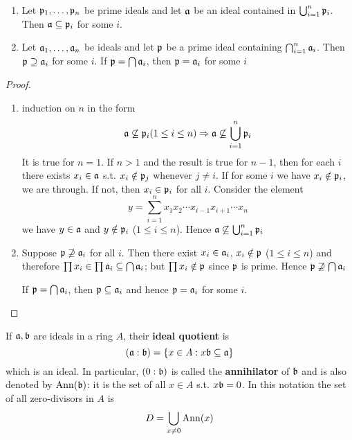 \documentclass[11pt]{article}
\begin{document}
\begin{proposition}[]
\label{1.11}
\begin{enumerate}
\item Let \(\mathfrak{p}_1,\dots,\mathfrak{p}_n\) be prime ideals and let \(\mathfrak{a}\) be an ideal contained in \(\bigcup_{i=1}^n\mathfrak{p}_i\).
Then \(\mathfrak{a}\subseteq\mathfrak{p}_i\) for some \(i\).
\item Let \(\mathfrak{a}_1,\dots,\mathfrak{a}_n\) be ideals and let \(\mathfrak{p}\) be a prime ideal containing \(\bigcap_{i=1}^n\mathfrak{a}_i\).
Then \(\mathfrak{p}\supseteq\mathfrak{a}_i\) for some \(i\). If \(\mathfrak{p}=\bigcap\mathfrak{a}_i\), then \(\mathfrak{p}=\mathfrak{a}_i\) for some \(i\)
\end{enumerate}
\end{proposition}

\begin{proof}
\begin{enumerate}
\item induction on \(n\) in the form
\begin{equation*}
\mathfrak{a}\not\subseteq\mathfrak{p}_i(1\le i\le n)\Rightarrow\mathfrak{a}\not\subseteq\bigcup_{i=1}^n\mathfrak{p}_i
\end{equation*}
It is true for \(n=1\). If \(n>1\) and the result is true for \(n-1\), then for each \(i\)
there exists \(x_i\in\mathfrak{a}\) s.t. \(x_i\notin\mathfrak{p}_j\) whenever \(j\neq i\). If for some \(i\) we have \(x_i\notin\mathfrak{p}_i\),
we are through. If not, then \(x_i\in\mathfrak{p}_i\) for all \(i\). Consider the element
\begin{equation*}
y=\sum_{i=1}^nx_1x_2\cdots x_{i-1}x_{i+1}\cdots x_n
\end{equation*}
we have \(y\in\mathfrak{a}\) and \(y\notin\mathfrak{p}_i\) (\(1\le i\le n\)). Hence \(\mathfrak{a}\not\subseteq\bigcup_{i=1}^n\mathfrak{p}_i\)
\item Suppose \(\mathfrak{p}\not\supseteq\mathfrak{a}_i\) for all \(i\). Then there exist \(x_i\in\mathfrak{a}_i\), \(x_i\notin\mathfrak{p}\) (\(1\le i\le n\)) and
therefore \(\prod x_i\in\prod\mathfrak{a}_i\subseteq\bigcap\mathfrak{a}_i\); but \(\prod x_i\notin\mathfrak{p}\) since \(\mathfrak{p}\) is prime. Hence \(\mathfrak{p}\not\supseteq\bigcap\mathfrak{a}_i\)

If \(\mathfrak{p}=\bigcap\mathfrak{a}_i\), then \(\mathfrak{p}\subseteq\mathfrak{a}_i\) and hence \(\mathfrak{p}=\mathfrak{a}_i\) for some \(i\).
\end{enumerate}
\end{proof}


If \(\mathfrak{a},\mathfrak{b}\) are ideals in a ring \(A\), their \textbf{ideal quotient} is
\begin{equation*}
(\mathfrak{a}:\mathfrak{b})=\{x\in A:x\mathfrak{b}\subseteq\mathfrak{a}\}
\end{equation*}
which is an ideal. In particular, \((0:\mathfrak{b})\) is called the \textbf{annihilator} of \(\mathfrak{b}\) and is also
denoted by \(\operatorname{Ann}(\mathfrak{b})\): it is the set of all \(x\in A\) s.t. \(x\mathfrak{b}=0\). In this notation the set of
all zero-divisors in \(A\) is
\begin{equation*}
D=\bigcup_{x\neq 0}\operatorname{Ann}(x)
\end{equation*}
\end{document}

